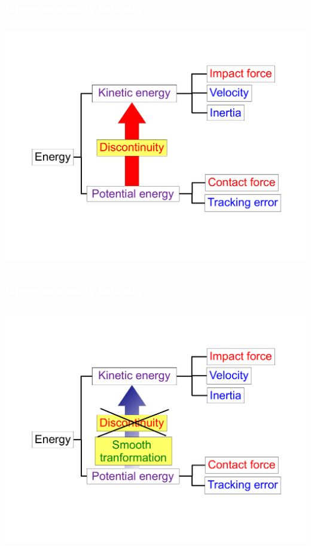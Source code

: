 \begin{frame}[noframenumbering]
\frametitle{{\textcolor{white}{Energy as a safety indicator}}}

\begin{columns}
\column{.95\paperwidth}

\begin{center}                
\includegraphics[width=1\textwidth ]{figures/fin09.pdf}
\end{center}       

\end{columns}

\end{frame}



\begin{frame}[noframenumbering]
\frametitle{{\textcolor{white}{Energy as a safety indicator}}}
\begin{columns}
\column{.95\paperwidth}
\begin{center}                
\includegraphics[width=1\textwidth ]{figures/fin10.pdf}
\end{center}       
\end{columns}
\end{frame}








